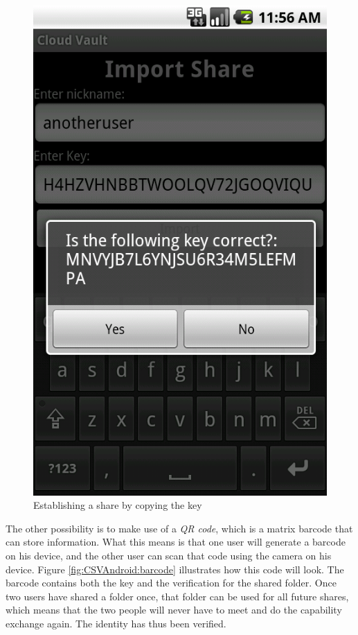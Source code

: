 \documentclass[pdftex,english,10pt,b5paper,twoside]{book}
\begin{document}
\begin{figure}[h!]
    \centering
    \includegraphics[scale=0.4]{client-manualimport.png}
    \caption{Establishing a share by copying the key}
    \label{fig:CSVAndroid:manualimport}
\end{figure}

The other possibility is to make use of a \emph{\ac{QR} code}, which is a matrix
barcode that can store information. What this means is that one user will
generate a barcode on his device, and the other user can scan that code using
the camera on his device. Figure \ref{fig:CSVAndroid:barcode} illustrates how
this code will look. The barcode contains both the key and the verification for
the shared folder. Once two users have shared a folder once, that folder can be
used for all future shares, which means that the two people will never have to
meet and do the capability exchange again. The identity has thus been verified.
\end{document}
